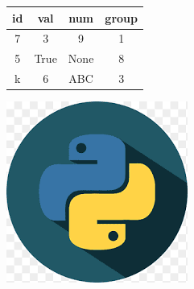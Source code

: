 \documentclass{article}
\begin{document}
\begin{tabular}{|c|c|c|c|}
\hline
id & val & num & group\\
\hline
7 & 3 & 9 & 1\\
\hline
5 & True & None & 8\\
\hline
k & 6 & ABC & 3\\
\hline
\end{tabular}
\graphicspath{ {/Users/ggerlakh/Desktop/магистратура_ИТМО_MHS/python_sem01/mhs-itmo-sem01-python/hw_2/artifacts} }

\includegraphics{python}
\end{document}
